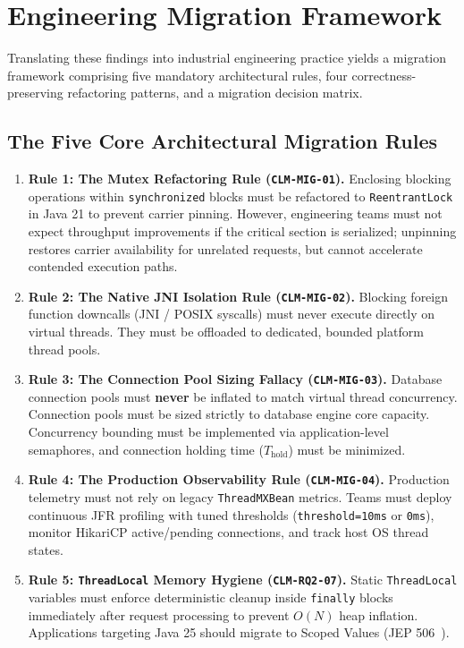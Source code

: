 \section{Engineering Migration Framework}
\label{sec:migration-framework}

Translating these findings into industrial engineering practice yields a migration framework comprising five mandatory architectural rules, four correctness-preserving refactoring patterns, and a migration decision matrix.

\subsection{The Five Core Architectural Migration Rules}
\begin{enumerate}
  \item \textbf{Rule 1: The Mutex Refactoring Rule (\texttt{CLM-MIG-01}).} Enclosing blocking operations within \texttt{synchronized} blocks must be refactored to \texttt{ReentrantLock} in Java 21 to prevent carrier pinning. However, engineering teams must not expect throughput improvements if the critical section is serialized; unpinning restores carrier availability for unrelated requests, but cannot accelerate contended execution paths.
  \item \textbf{Rule 2: The Native JNI Isolation Rule (\texttt{CLM-MIG-02}).} Blocking foreign function downcalls (JNI / POSIX syscalls) must never execute directly on virtual threads. They must be offloaded to dedicated, bounded platform thread pools.
  \item \textbf{Rule 3: The Connection Pool Sizing Fallacy (\texttt{CLM-MIG-03}).} Database connection pools must \textbf{never} be inflated to match virtual thread concurrency. Connection pools must be sized strictly to database engine core capacity. Concurrency bounding must be implemented via application-level semaphores, and connection holding time ($T_{\text{hold}}$) must be minimized.
  \item \textbf{Rule 4: The Production Observability Rule (\texttt{CLM-MIG-04}).} Production telemetry must not rely on legacy \texttt{ThreadMXBean} metrics. Teams must deploy continuous JFR profiling with tuned thresholds (\texttt{threshold=10ms} or \texttt{0ms}), monitor HikariCP active/pending connections, and track host OS thread states.
  \item \textbf{Rule 5: \texttt{ThreadLocal} Memory Hygiene (\texttt{CLM-RQ2-07}).} Static \texttt{ThreadLocal} variables must enforce deterministic cleanup inside \texttt{finally} blocks immediately after request processing to prevent $O(N)$ heap inflation. Applications targeting Java 25 should migrate to Scoped Values (JEP 506~\cite{JEP506}).
\end{enumerate}

